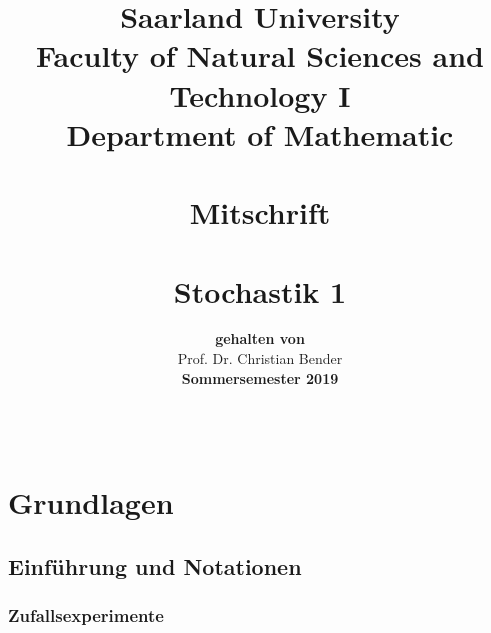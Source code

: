 \documentclass[12pt,fleqn]{report}
\begin{document}
\begin{titlepage}
\title{\vspace{-5cm}\small Saarland University\\
Faculty of Natural Sciences and Technology I\\
Department of Mathematic\\
\mbox{} \vspace{4cm}\\
\small\sansfont Mitschrift \\
\mbox{} \vspace{0.2cm}\\
  {\Huge\sansfont  Stochastik 1}\\}



\author{\textbf{\sansfont \scriptsize gehalten von}\\
Prof. Dr. Christian Bender\\
\scriptsize\sansfont\textbf{Sommersemester 2019}\\
\vspace{1cm}\\
\vspace{1cm}\\
}
\date{}
\end{titlepage}
\maketitle


\pagebreak
{\sansfont \small
\tableofcontents
}
\cleardoublepage
{}




\part{Grundlagen}

\chapter{Einführung und Notationen}

\section{Zufallsexperimente}
\end{document}
